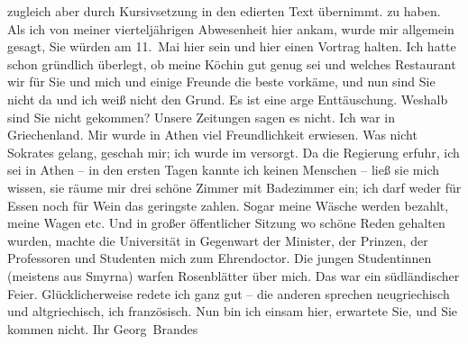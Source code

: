 \begin{ledgroupsized}[t]{13cm}
{{{{                     zugleich aber durch Kursivsetzung in den edierten Text übernimmt.}}}\label{K_L02383-1h}} zu haben.\pend
           \pstart
           Als ich von meiner vierteljährigen Abwesenheit hier ankam, wurde mir allgemein
               gesagt, Sie würden am 11. Mai hier sein und hier einen Vortrag halten.
               Ich hatte schon gründlich überlegt, ob meine Köchin gut genug sei und welches Restaurant wir für Sie und
               mich und einige Freunde die beste vorkäme, und nun sind Sie nicht da und ich weiß
               nicht den Grund. Es ist eine arge Enttäuschung. Weshalb sind Sie nicht gekommen?
               Unsere Zeitungen sagen es nicht.\pend
           \pstart
           Ich war in Griechenland. Mir wurde in Athen viel Freundlichkeit erwiesen. Was nicht Sokrates gelang, geschah mir; ich wurde im
                  \label{K_L02383-2v}\label{K_L02383-2h} versorgt. Da die
               Regierung erfuhr, ich sei in Athen – in den
               ersten Tagen kannte ich keinen Menschen – ließ sie mich wissen, sie räume mir drei
               schöne Zimmer mit Badezimmer ein; ich darf weder für Essen noch für Wein das
               geringste zahlen. Sogar meine Wäsche werden bezahlt, meine Wagen etc. Und in großer
               öffentlicher Sitzung wo schöne Reden gehalten wurden, machte die Universität in Gegenwart der Minister, der Prinzen, der
               Professoren und Studenten mich zum Ehrendoctor. Die jungen Studentinnen (meistens aus
                  Smyrna) warfen Rosenblätter über mich. Das
               war ein südländischer Feier. Glücklicherweise redete ich ganz gut – die
               anderen sprechen neugriechisch und altgriechisch, ich französisch.\pend
           \pstart
           Nun bin ich einsam hier, erwartete Sie, und Sie kommen nicht.\pend
           \pstart Ihr \spacefill\mbox{Georg Brandes}\pend{}
         
         \endnumbering{}\end{ledgroupsized}  \newcommand{\dateiname}{L02383}\newcommand{\titel}{Georg Brandes an Arthur Schnitzler, 15. 5. 1922}\newcommand{\editorInnen}{Martin Anton Müller und Gerd-Hermann Susen}
      